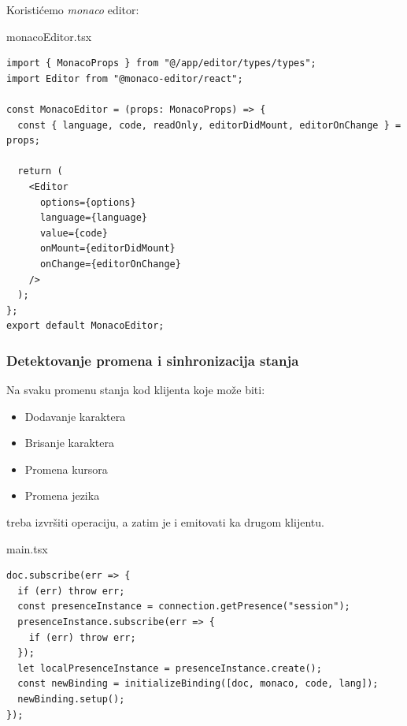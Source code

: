 \documentclass[12pt]{article}
\begin{document}
Koristićemo \textit{monaco} editor:

\begin{mylisting}[label={lst:example}]{monacoEditor.tsx}
\begin{lstlisting}
import { MonacoProps } from "@/app/editor/types/types";
import Editor from "@monaco-editor/react";

const MonacoEditor = (props: MonacoProps) => {
  const { language, code, readOnly, editorDidMount, editorOnChange } = props;

  return (
    <Editor
      options={options}
      language={language}
      value={code}
      onMount={editorDidMount}
      onChange={editorOnChange}
    />
  );
};
export default MonacoEditor;
\end{lstlisting}
\end{mylisting}

\subsubsection{Detektovanje promena i sinhronizacija stanja}

Na svaku promenu stanja kod klijenta koje može biti:

\begin{itemize}
    \item Dodavanje karaktera
    \item Brisanje karaktera
    \item Promena kursora
    \item Promena jezika
\end{itemize}

treba izvršiti operaciju, a zatim je i emitovati ka drugom klijentu.

\begin{mylisting}[label={lst:example}]{main.tsx}
\begin{lstlisting}
doc.subscribe(err => {
  if (err) throw err;
  const presenceInstance = connection.getPresence("session");
  presenceInstance.subscribe(err => {
    if (err) throw err;
  });
  let localPresenceInstance = presenceInstance.create();
  const newBinding = initializeBinding([doc, monaco, code, lang]);
  newBinding.setup();
});

\end{lstlisting}
\end{mylisting}
\end{document}
